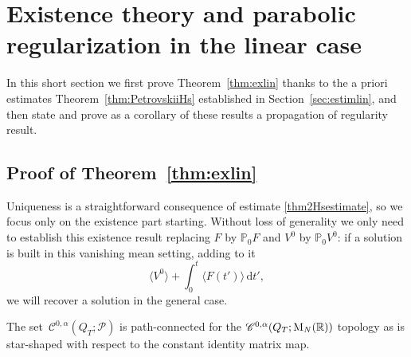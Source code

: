 \documentclass[JEP,XML,SOM,Unicode,published]{cedram}
\theoremstyle{definition}
\newcommand\R{\mathbb{R}}
\newcommand\dd{\mathrm{d}}
\begin{document}
\section{Existence theory and parabolic regularization in the linear case}\label{sec:exlin}
In this short section we first prove Theorem~\ref{thm:exlin} thanks to the a priori estimates Theorem~\ref{thm:PetrovskiiHs} established in Section~\ref{sec:estimlin}, and then state and prove as a corollary of these results a propagation of regularity result.

\subsection{Proof of Theorem~\ref{thm:exlin}}

Uniqueness is a straightforward consequence of estimate \eqref{thm2Hsestimate}, so we focus only on the existence part starting. Without loss of generality we only need to establish this existence result replacing $F$ by $\mathbb{P}_0 F$ and $V^0$ by $\mathbb{P}_0 V^0$: if a solution is built in this vanishing mean setting, adding to it
\[
\langle V^0\rangle + \int_0^t \langle F(t')\rangle\,\dd t',
\]
we will recover a solution in the general case.

The set~$\mathscr{C}^{0,\alpha}(Q_T;\mathscr{P})$ is path-connected for the $\mathscr{C}^{0,\alpha}(Q_T;\textnormal{M}_N(\R))$ topology as is star-shaped with respect to the constant identity matrix map.
\end{document}
